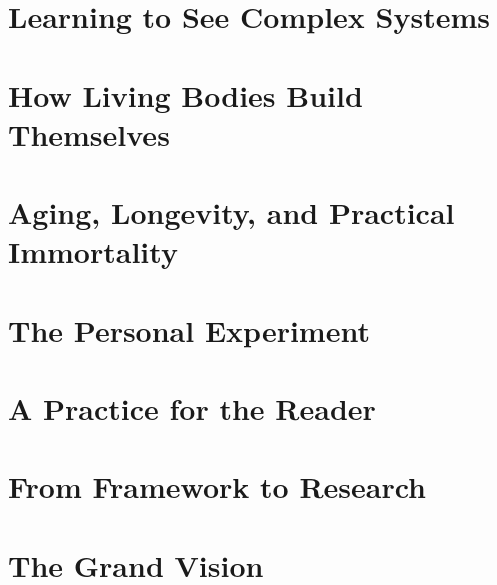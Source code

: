 \documentclass[11pt,twoside,openright]{scrbook}
\begin{document}

\frontmatter

\tableofcontents
\cleardoublepage
\mainmatter

\part{Learning to See Complex Systems}






\part{How Living Bodies Build Themselves}






\part{Aging, Longevity, and Practical Immortality}







\part{The Personal Experiment}




\part{A Practice for the Reader}




\part{From Framework to Research}



\part{The Grand Vision}


\backmatter
\printbibliography[heading=bibintoc,title={References}]
\end{document}
